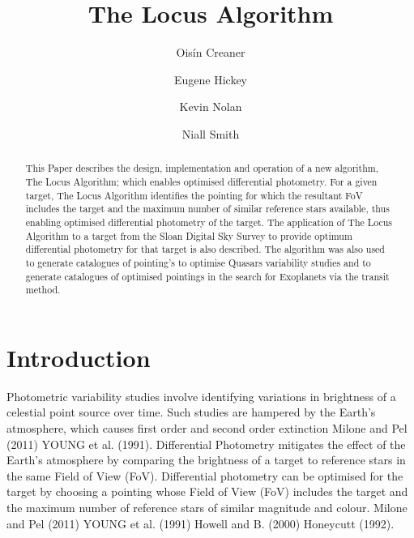 \documentclass[]{elsarticle} %
\begin{document}
\begin{frontmatter}

\title{The Locus Algorithm}


\author[DIAS,TUD]{Ois\'in Creaner}

\author[TUD]{Eugene Hickey}
\author[TUD]{Kevin Nolan}
\author[CIT]{Niall Smith}

\address[DIAS]{Dublin Institute for Advanced Studies, 31 Fitzwilliam Place, Dublin 2, Ireland}
\address[TUD]{Technological University Dublin, Tallaght Campus, Dublin 24, Ireland}
\address[CIT]{Cork Institute of Technology, Bishopstown, Cork, Ireland}

  
  \begin{abstract}
  This Paper describes the design, implementation and operation of a new algorithm,
  The Locus Algorithm; which enables optimised differential photometry.
  For a given target, The Locus Algorithm identifies the pointing for
  which the resultant FoV includes the target and the maximum number of
  similar reference stars available, thus enabling optimised differential
  photometry of the target. The application of The Locus
  Algorithm to a target from the Sloan Digital Sky Survey to provide
  optimum differential photometry for that target is also described. The algorithm was also
  used to generate catalogues of pointing's to optimise Quasars
  variability studies and to generate catalogues of optimised pointings in
  the search for Exoplanets via the transit method.
  \end{abstract}
  
 \end{frontmatter}

\hypertarget{introduction}{%
\section{Introduction}\label{introduction}}

Photometric variability studies involve identifying variations in
brightness of a celestial point source over time. Such studies are
hampered by the Earth's atmosphere, which causes first order and second
order extinction Milone and Pel (2011) YOUNG et al. (1991). Differential
Photometry mitigates the effect of the Earth's atmosphere by comparing
the brightness of a target to reference stars in the same Field of View
(FoV). Differential photometry can be optimised for the target by
choosing a pointing whose Field of View (FoV) includes the target and
the maximum number of reference stars of similar magnitude and colour.
Milone and Pel (2011) YOUNG et al. (1991) Howell and B. (2000) Honeycutt
(1992).
\end{document}
